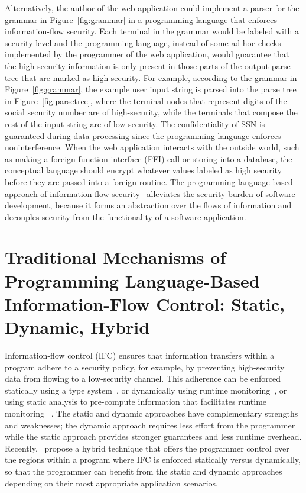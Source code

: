 Alternatively, the author of the web application could implement a parser for
the grammar in Figure~\ref{fig:grammar} in a programming language that enforces
information-flow security. Each terminal in the grammar would be labeled with a
security level and the programming language, instead of some ad-hoc checks
implemented by the programmer of the web application, would guarantee that the
high-security information is only present in those parts of the output parse
tree that are marked as high-security. For example, according to the grammar in
Figure~\ref{fig:grammar}, the example user input string is parsed into the parse
tree in Figure~\ref{fig:parsetree}, where the terminal nodes that represent
digits of the social security number are of {\color{red} high-security}, while
the terminals that compose the rest of the input string are of {\color{green}
  low-security}. The confidentiality of SSN is guaranteed during data processing
since the programming language enforces noninterference. When the web
application interacts with the outside world, such as making a foreign function
interface (FFI) call or storing into a database, the conceptual language should
encrypt whatever values labeled as high security before they are passed into a
foreign routine. The programming language-based approach of information-flow
security~\parencite{sabelfeld2003language} alleviates the security burden of
software development, because it forms an abstraction over the flows of
information and decouples security from the functionality of a software
application.


\section{Traditional Mechanisms of Programming Language-Based
         Information-Flow Control: Static, Dynamic, Hybrid}

Information-flow control (IFC) ensures that information transfers within a
program adhere to a security policy, for example, by preventing high-security
data from flowing to a low-security channel. This adherence can be enforced
statically using a type
system~\parencite{volpano1996sound,Myers:1997aa,myers1999jflow}, or dynamically
using runtime
monitoring~\parencite{Askarov:2009vq,austin2009efficient,Devriese:2010up,stefan2011flexible,Austin:2017uh,Xiang:2021ub},
or using static analysis to pre-compute information that facilitates runtime
monitoring
~\parencite{le2005monitoring,le2007automaton,Chandra:2007we,Shroff:2007tg,russo2010dynamic,moore2011static}.
The static and dynamic approaches have complementary strengths and weaknesses;
the dynamic approach requires less effort from the programmer while the static
approach provides stronger guarantees and less runtime overhead.
Recently,~\textcite{Buiras:2015aa} propose a hybrid technique that offers the
programmer control over the regions within a program where IFC is enforced
statically versus dynamically, so that the programmer can benefit from the
static and dynamic approaches depending on their most appropriate application
scenarios.

